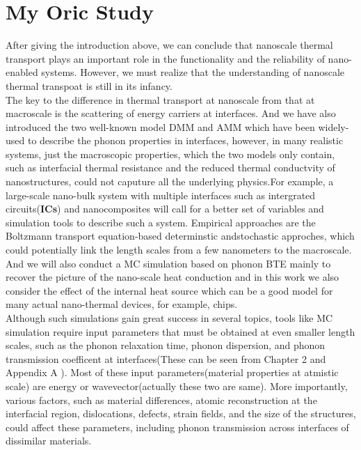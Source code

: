 \section{My Oric Study}
After giving the introduction above, we can conclude that nanoscale thermal transport plays an important role in the functionality and the reliability of nano-enabled systems. However, we must realize that the understanding of nanoscale thermal transpoat is still in its infancy.\\
\indent The key to the difference in thermal transport at nanoscale from that at macroscale is the scattering of energy carriers at interfaces. And we have also introduced the two well-known model DMM and AMM which have been widely-used to describe the phonon properties in interfaces, however, in many realistic systems, just the macroscopic properties, which the two models only contain, such as interfacial thermal resistance and the reduced thermal conductvity of nanostructures, could not caputure all the underlying physics\cite{yang2004thermal,yang2005thermal}.For example, a large-scale nano-bulk system with multiple interfaces such as intergrated circuits(\textbf{ICs})\cite{IC} and nanocomposites\cite{yang2005thermal} will call for a better set of variables and simulation tools to describe such a system. Empirical approaches are the Boltzmann transport equation-based determinstic andstochastic approches, which could potentially link the length scales from a few nanometers to the macroscale\cite{LD2}. And we will also conduct a MC simulation based on phonon BTE mainly to recover the picture of the nano-scale heat conduction and in this work we also consider the effect of the internal heat source which can be a good model for many actual nano-thermal devices, for example, chips.\\
\indent Although such simulations gain great success in several topics, tools like MC simulation require input parameters that must be obtained at even smaller length scales, such as the phonon relaxation time, phonon dispersion, and phonon transmission coefficent at interfaces(These can be seen from Chapter 2 and Appendix A ). Most of these input parameters(material properties at atmistic scale) are energy or wavevector(actually these two are same). More importantly, various factors, such as material differences, atomic reconstruction at the interfacial region, dislocations, defects, strain fields, and the size of the structures, could affect these parameters, including phonon transmission across interfaces of dissimilar materials\cite{li2012size}.\\
